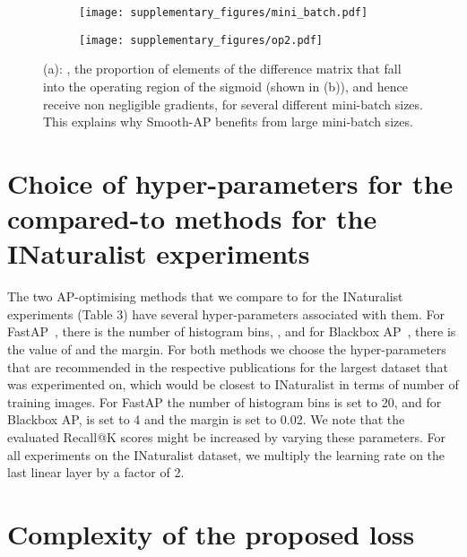 \documentclass[runningheads]{llncs}
\begin{document}
\begin{figure}
\centering
\begin{subfigure}{.65\textwidth}
  \centering
  \texttt{[image: supplementary\_figures/mini\_batch.pdf]}
  \caption{}
  \label{fig:sub1}
\end{subfigure}\begin{subfigure}{.35\textwidth}
  \centering
  \texttt{[image: supplementary\_figures/op2.pdf]}
  \caption{}
  \label{fig:sub2}
\end{subfigure}
\caption{\small{ (a): , the proportion of elements of the difference matrix that fall into the operating region of the sigmoid (shown in (b)), and hence receive non negligible gradients, for several different mini-batch sizes. This explains why Smooth-AP benefits from large mini-batch sizes. }}
\label{fig:mini_batch_P}
\end{figure}
 \label{sec:method}


\section{Choice of hyper-parameters for the compared-to methods for the INaturalist experiments}
The two AP-optimising methods that we compare to for the INaturalist experiments (Table 3) have several hyper-parameters associated with them. 
For FastAP~\cite{Cakir19}, there is the number of histogram bins, ,
and for Blackbox AP~\cite{Rolnek20optimizing}, there is the value of  and the margin. 
For both methods we choose the hyper-parameters that are recommended in the respective publications for the largest dataset that was experimented on, which would be closest to INaturalist in terms of number of training images. For FastAP the number of histogram bins  is set to 20, and for Blackbox AP, 
 is set to 4 and the margin is set to 0.02. We note that the evaluated Recall@K scores might be increased by varying these parameters. For all experiments on the INaturalist dataset, we multiply the learning rate on the last linear layer by a factor of 2. \label{sec:method}


\section{Complexity of the proposed loss}
\end{document}
